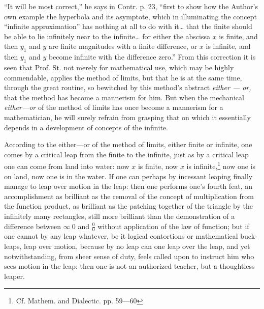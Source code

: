 \documentclass[12pt,a4paper,openany]{book}
\newcommand{\opage}[1]{\marginnote{\footnotesize\textit{[#1]}}}
\begin{document}
``It will be most correct,'' he says in Contr. p. 23,
``first to show how the Author's own example the hyperbola and
\opage{43}\setcounter{footnote}{0}%
its asymptote, which in illuminating the concept ``infinite approximation'' has nothing at all to do with it\dots{} that the finite
\opage{44}\setcounter{footnote}{0}%
should be able to lie infinitely near to the infinite\dots{} for
either the abscissa $x$ is finite, and then $y_{1}$ and $y$ are finite
magnitudes with a finite difference, or $x$ is infinite,
and then $y_{1}$ and $y$ become infinite with the difference zero.'' From
this correction it is seen that Prof. St. not merely for mathematical use, which may be highly commendable, applies
the method of limits, but that he is at the same time, through the great
routine, so bewitched by this method's abstract
\emph{either --- or,} that the method has become a mannerism for him.
But when the mechanical \emph{either---or} of the method of limits has once
become a mannerism for a mathematician, he will surely refrain
from grasping that on which it essentially depends in a
development of concepts of the infinite.

According to the either---or of the method of limits, either finite
or infinite, one comes by a critical leap from the finite to the infinite, just as by a critical leap one can
come from land into water: now $x$ is finite, now $x$ is
infinite,\footnote{Cf. Mathem. and Dialectic. pp. 59---60} now one is on land, now one is in the water.
If one can perhaps by incessant leaping finally manage
to leap over motion in the leap: then one performs
one's fourth feat, an accomplishment as brilliant
as the removal of the concept of multiplication from the function product, as brilliant as the patching together of the
triangle by the infinitely many rectangles, still more
brilliant than the demonstration of a difference between $\infty\ 0$
\opage{45}\setcounter{footnote}{0}%
and $\frac{0}{0}$ without application of the law of function; but if one cannot
by any leap whatever, be it logical contortions
or mathematical buck-leaps, leap over motion,
because by no leap can one leap over the leap,
and yet notwithstanding, from sheer sense of duty, feels called upon to
instruct him who sees motion in the leap: then one is
not an authorized teacher, but a thoughtless leaper.
\end{document}
